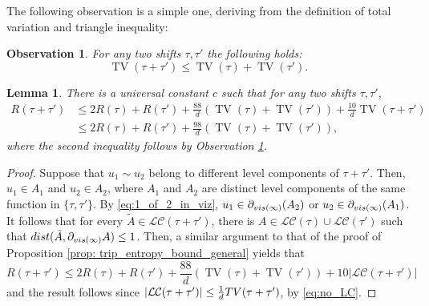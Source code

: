 \documentclass[11pt, reqno]{amsart}
\newtheorem{lemma}[theorem]{Lemma}
\newtheorem{obs}[theorem]{Observation}
\DeclareMathOperator{\TV}{TV}
\numberwithin{equation}{section}
\begin{document}
The following observation is a simple one, deriving from the definition of total variation and triangle inequality:
\begin{obs}\label{obs:upper_bound_TV_of_sum}
For any two shifts $\tau,\tau'$ the following holds:
\begin{equation*}
\TV(\tau+\tau')\leq \TV(\tau)+\TV(\tau').
\end{equation*}
\end{obs}

\begin{lemma}\label{lem:upper_bound_R_of_sum}
There is a universal constant $c$ such that for any two shifts $\tau,\tau'$,
    \begin{align*}
R\left(\tau+\tau'\right)& \leq 2R\left(\tau\right)+R\left(\tau'\right)+\frac{88}{d}\left(\TV\left(\tau\right)+\TV\left(\tau'\right)\right)+\frac{10}{d} \TV(\tau+\tau')\\ & \leq 2R\left(\tau\right)+R\left(\tau'\right)+\frac{98}{d}\left(\TV\left(\tau\right)+\TV\left(\tau'\right)\right),
\end{align*}
where the second inequality follows 
by Observation \ref{obs:upper_bound_TV_of_sum}.
\end{lemma}

\begin{proof}
Suppose that $u_1\sim u_2$ belong to different level components of $\tau+\tau'$. Then, $u_1\in A_1$ and $u_2\in A_2$, where $A_1$ and $A_2$ are distinct level components of the same function in $\{\tau,\tau'\}$. By \eqref{eq:1_of_2_in_viz}, $u_1\in \partial_{{\rm vis}(\infty)}(A_2)$ or $u_2\in \partial_{{\rm vis}(\infty)}(A_1)$.
It follows that for every $\tilde{A}\in\mathcal{LC}(\tau+\tau')$, there is $A\in\mathcal{LC}(\tau)\cup\mathcal{LC}(\tau')$
such that ${\rm dist}(\tilde{A}, \partial_{{\rm vis}(\infty)}A) \leq 1 $. Then, a similar argument to that of the proof of Proposition \ref{prop: trip_entropy_bound_general} yields that 
\begin{equation*}
R(\tau+\tau') \leq 2R(\tau) + R(\tau')+\frac{88}{d} \left(\TV(\tau)+\TV(\tau')\right) + 10\lvert\mathcal{LC}(\tau+\tau')\rvert
\end{equation*}
and the result follows since $\lvert\mathcal{LC}(\tau+\tau')\rvert\leq \frac{1}{d} {\rm TV}(\tau+\tau')$, 
by \eqref{eq:no_LC}.
\end{proof}
\end{document}
